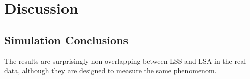 \documentclass[10pt,letterpaper]{article}
\begin{document}





\section*{Discussion}
\label{discussion}

\subsection*{Simulation Conclusions}
\label{discussion:simulation-conclusions}

The results are surprisingly non-overlapping between LSS and LSA in the real data,
although they are designed to measure the same phenomenom.
\end{document}
